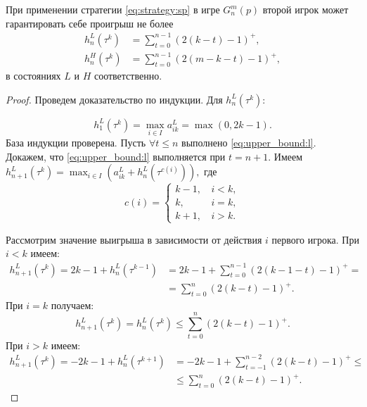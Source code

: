 \begin{utver}
При применении стратегии \eqref{eq:strategy:sp} в игре $ G_n^m(p) $ второй игрок может гарантировать себе проигрыш не более
\begin{align}
\label{eq:upper_bound:l}
h_n^L(\tau^k) &= \sum_{t=0}^{n-1}
    (2(k - t) - 1)^+,\\
\label{eq:upper_bound:h}
h_n^H(\tau^k) &= \sum_{t=0}^{n-1}
    (2(m - k - t) - 1)^+,
\end{align}
в состояниях $ L $ и $ H $ соответственно.
\end{utver}
\begin{proof}
Проведем доказательство по индукции.
Для $ h_n^L(\tau^k) $:

\[ 
h_1^L(\tau^k) = \max_{i \in I} a_{ik}^L = \max(0, 2k - 1).
\]
База индукции проверена.
Пусть $ \forall t \leq n $ выполнено \eqref{eq:upper_bound:l}. 
Докажем, что \eqref{eq:upper_bound:l} выполняется при $ t=n+1 $. Имеем
$
h_{n+1}^L(\tau^k) = \max_{i \in I} (a_{ik}^L + h_n^L(\tau^{c(i)})),
$
где
\[ 
c(i) = \begin{cases}
    k - 1, &\, i < k, \\
    k, &\, i = k, \\
    k + 1, &\, i > k.
\end{cases}
\]

Рассмотрим значение выигрыша в зависимости от действия $ i $ первого игрока. 
При $ i < k $ имеем:
\begin{align*}
  h_{n+1}^L(\tau^k) = 2k - 1 + h_n^L(\tau^{k-1}) &= 2k - 1 + \sum_{t = 0}^{n-1} (2(k-1-t)-1)^+ = \\
  &= \sum_{t = 0}^n (2(k-t) - 1)^+.
\end{align*}
При $ i = k $ получаем:
\[
  h_{n+1}^L(\tau^k) = h_n^L(\tau^k) \leq \sum_{t=0}^n(2(k-t)-1)^+.
\]
При $ i > k $ имеем:
\begin{align*}
  h_{n+1}^L(\tau^k) = -2k - 1 + h_n^L(\tau^{k+1}) &= -2k - 1 + \sum_{t = -1}^{n-2} (2(k-t)-1)^+ \leq \\
  &\leq \sum_{t=0}^n(2(k-t)-1)^+.
\end{align*}


\end{proof}
